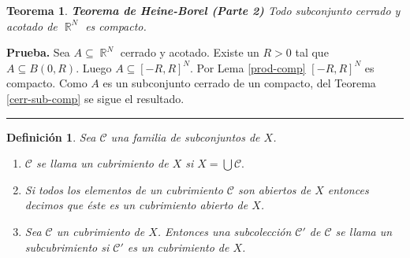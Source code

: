 \documentclass[x11names, 12pt]{book}
\newtheorem{definicion}{Definición}
\newtheorem{teorema}{Teorema}
\newenvironment{prueba}[1][Prueba]{\noindent\textbf{#1.} }{\ \rule{0.5em}{0.5em}}
\DeclareMathOperator{\R}{\mathbb{R}}
\begin{document}
\begin{teorema}{\textbf{Teorema de Heine-Borel (Parte 2)}}
Todo subconjunto cerrado y acotado de $\R^N$ es compacto.
\end{teorema}
\begin{prueba}
Sea $A\subseteq \R^N$ cerrado y acotado. Existe un $R>0$ tal que $A\subseteq B(0, R).$ Luego $A\subseteq [-R, R]^N$.  Por Lema \ref{prod-comp} $[-R, R]^N$ es compacto. Como $A$ es un subconjunto cerrado de un compacto, del Teorema \ref{cerr-sub-comp} se sigue el resultado.
\end{prueba}

\begin{definicion}
Sea  $\mathcal{C}$ una familia de subconjuntos de $X$.
\begin{enumerate}
    \item $\mathcal{C}$ se llama un cubrimiento de $X$ si $X = \bigcup \mathcal{C}.$
    \item Si todos los elementos de un cubrimiento $\mathcal{C}$ son abiertos de $X$ entonces decimos que éste es un cubrimiento abierto de $X$.
    \item Sea $\mathcal{C}$  un cubrimiento de $X$. Entonces  una subcolección  $\mathcal{C}'$ de $\mathcal{C}$ se llama un subcubrimiento si $\mathcal{C}'$ es un cubrimiento de $X$.
\end{enumerate}
\end{definicion}
\end{document}

